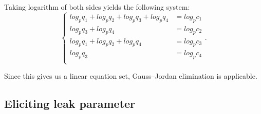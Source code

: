 Taking logarithm of both sides yields the following system:
\begin{equation}
\begin{cases}
    log_p{q_1} + log_p{q_2} + log_p{q_3} + log_p{q_4} &= log_p{c_1}\\
    log_p{q_3} + log_p{q_4} &= log_p{c_2}\\
    log_p{q_1} + log_p{q_2} + log_p{q_4} &= log_p{c_3}\\
    log_p{q_3} &= log_p{c_4}\\
\end{cases}.
\end{equation}

Since this gives us a linear equation set, Gauss--Jordan elimination is applicable.
\subsection{Eliciting leak parameter}

